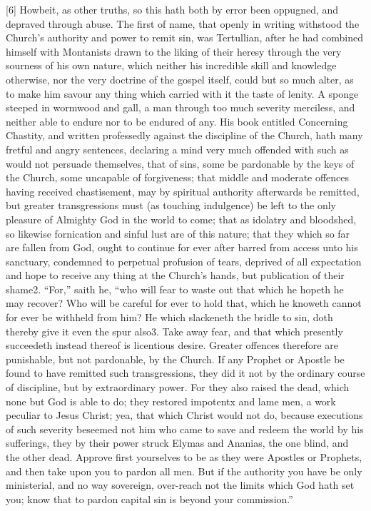 [6] Howbeit, as other truths, so this hath both by error been oppugned, and depraved through abuse. The first of name, that openly in writing withstood the Church’s authority and power to remit sin, was Tertullian, after he had combined himself with Montanists drawn to the liking of their heresy through the very sourness of his own nature, which neither his incredible skill and knowledge otherwise, nor the very doctrine of the gospel itself, could but so much alter, as to make him savour any thing which carried with it the taste of lenity. A sponge steeped in wormwood and gall, a man through too much severity merciless, and neither able to endure nor to be endured of any. His book entitled Concerning Chastity, and written professedly against the discipline of the Church, hath many fretful and angry sentences, declaring a mind very much offended with such as would not persuade themselves, that of sins, some be pardonable by the keys of the Church, some uncapable of forgiveness; that middle and moderate offences having received chastisement, may by spiritual authority afterwards be remitted, but greater transgressions must (as touching indulgence) be left to the only pleasure of Almighty God in the world to come; that as idolatry and bloodshed, so likewise fornication and sinful lust  are of this nature; that they which so far are fallen from God, ought to continue for ever after barred from access unto his sanctuary, condemned to perpetual profusion of tears, deprived of all expectation and hope to receive any thing at the Church’s hands, but publication of their shame2. “For,” saith he, “who will fear to waste out that which he hopeth he may recover? Who will be careful for ever to hold that, which he knoweth cannot for ever be withheld from him? He which slackeneth the bridle to sin, doth thereby give it even the spur also3. Take away fear, and that which presently succeedeth instead thereof is licentious desire. Greater offences therefore are punishable, but not pardonable, by the Church. If any Prophet or Apostle be found to have remitted such transgressions, they did it not by the ordinary course of discipline, but by extraordinary power. For they also raised the dead, which none but God is able to do; they restored impotentx and lame men, a work peculiar to Jesus Christ; yea, that which Christ would not do, because executions of such severity beseemed not him who came to save and redeem the world by his sufferings, they by their power struck Elymas and Ananias, the one blind, and the other dead. Approve first yourselves to be as they were  Apostles or Prophets, and then take upon you to pardon all men. But if the authority you have be only ministerial, and no way sovereign, over-reach not the limits which God hath set you; know that to pardon capital sin is beyond your commission.”

